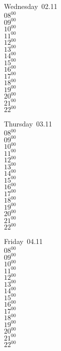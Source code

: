 \documentclass[11pt,a4paper]{book}\usepackage[]{graphicx}\usepackage[]{color}
\begin{document}
\begin{weekdaybox}
  Wednesday~02.11\\
  { 
  \vfill
  $08^{00}$\\
$09^{00}$\\
$10^{00}$\\
$11^{00}$\\
$12^{00}$\\
$13^{00}$\\
$14^{00}$\\
$15^{00}$\\
$16^{00}$\\
$17^{00}$\\
$18^{00}$\\
$19^{00}$\\
$20^{00}$\\
$21^{00}$\\
$22^{00}$\\
  }
\end{weekdaybox}
\clearpage
\begin{headerbox}
\end{headerbox}
\begin{weekdaybox}
  Thursday~03.11\\
  { 
  \vfill
  $08^{00}$\\
$09^{00}$\\
$10^{00}$\\
$11^{00}$\\
$12^{00}$\\
$13^{00}$\\
$14^{00}$\\
$15^{00}$\\
$16^{00}$\\
$17^{00}$\\
$18^{00}$\\
$19^{00}$\\
$20^{00}$\\
$21^{00}$\\
$22^{00}$\\
  }
\end{weekdaybox} 
\begin{weekdaybox}
  Friday~04.11\\
  { 
  \vfill
  $08^{00}$\\
$09^{00}$\\
$10^{00}$\\
$11^{00}$\\
$12^{00}$\\
$13^{00}$\\
$14^{00}$\\
$15^{00}$\\
$16^{00}$\\
$17^{00}$\\
$18^{00}$\\
$19^{00}$\\
$20^{00}$\\
$21^{00}$\\
$22^{00}$\\
  }
\end{weekdaybox}
\end{document}
